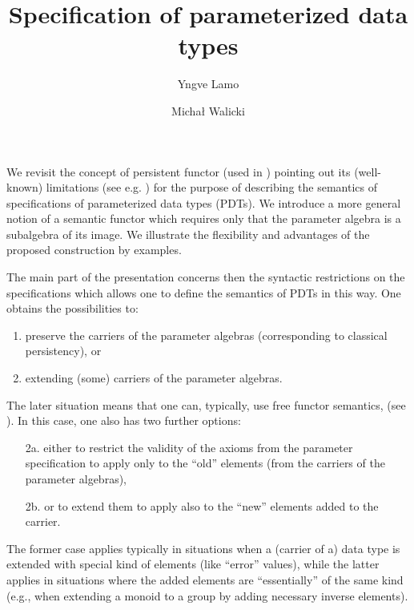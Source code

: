 \documentclass{llncs}
\begin{document}
\title{Specification of parameterized data types}

\author{Yngve Lamo
\and Micha{\l} Walicki}
\maketitle

We revisit the concept of persistent functor (used in \cite{paramADJ,Alge,paramGanz,CATs}) pointing out its (well-known)
limitations (see e.g. \cite{para}) for the purpose of describing the semantics of specifications of
parameterized data types (PDTs). We introduce a more general notion of a semantic 
functor which requires only that the parameter algebra is a
subalgebra of
its image. We illustrate the flexibility and advantages of the proposed
construction by examples.

The main part of the presentation concerns then the syntactic restrictions on
the specifications which allows one to define the semantics of PDTs in this
way. One obtains the possibilities to:
\begin{enumerate}
\item preserve the carriers of the parameter algebras (corresponding to
classical persistency), or
\item extending (some) carriers of the parameter algebras.
\end{enumerate}
The later situation means that one can, typically, use free functor
semantics, (see \cite{Alge}). In this case, one also has two further options:
\begin{itemize}
\item[2a.] either to restrict the validity of the axioms from the parameter
specification to apply only to the ``old'' elements (from the carriers of the
parameter algebras),
\item[2b.] or to extend them to apply also to the ``new'' elements added to
the carrier.
\end{itemize}
The former case applies typically in situations when  a (carrier of a) data
type is extended
with special kind of elements (like ``error'' values), while the latter applies in
situations where the added elements are ``essentially'' of the same
kind (e.g., when extending a monoid to a group by adding necessary inverse
elements).
\end{document}
